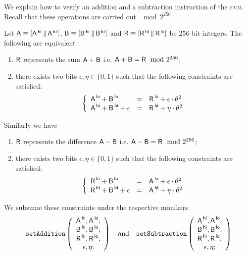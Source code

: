 We explain how to verify an addition and a subtraction instruction of the \textsc{evm}. Recall that these operations are carried out $\mod 2^{256}$.
\begin{lem}
Let
$\mathsf{A} \equiv [\mathsf{A}^{\mathsf{\,hi}} \,\|\, \mathsf{A}^{\mathsf{\,lo}}]$,
$\mathsf{B} \equiv [\mathsf{B}^{\mathsf{\,hi}} \,\|\, \mathsf{B}^{\mathsf{\,lo}}]$ and
$\mathsf{R} \equiv [\mathsf{R}^{\mathsf{\,hi}} \,\|\, \mathsf{R}^{\mathsf{\,lo}}]$
be $256$-bit integers. The following are equivalent
\begin{enumerate}
	\item $\mathsf{R}$ represents the sum $\textsf{A} + \textsf{B}$ i.e. $\textsf{A} + \textsf{B} = \textsf{R} \mod 2^{256}$;
	\item there exists two bits $\epsilon,\eta\in\{0,1\}$ such that the following constraints are satisfied:
	\[
		\left\{ \begin{array}{lcl}
			\textsf{A}^{\mathsf{\,lo}}  + \textsf{B}^{\mathsf{\,lo}}             & = & \textsf{R}^{\mathsf{\,lo}}  + \epsilon \cdot \theta^2 \\
			\textsf{A}^{\mathsf{\,hi}} + \textsf{B}^{\mathsf{\,hi}} + \epsilon & = & \textsf{R}^{\mathsf{\,hi}} + \eta     \cdot \theta^2 \\
		\end{array} \right.
	\]
\end{enumerate}
Similarly we have
\begin{enumerate}
	\item $\mathsf{R}$ represents the difference $\textsf{A} - \textsf{B}$ i.e. $\textsf{A} - \textsf{B} = \textsf{R} \mod 2^{256}$;%
	\item there exists two bits $\epsilon,\eta\in\{0,1\}$ such that the following constraints are satisfied:
	\[
		\left\{ \begin{array}{lcl}
			\textsf{R}^{\mathsf{\,lo}} + \textsf{B}^{\mathsf{\,lo}}              & = & \textsf{A}^{\mathsf{\,lo}}  + \epsilon \cdot \theta^2 \\
			\textsf{R}^{\mathsf{\,hi}} + \textsf{B}^{\mathsf{\,hi}} + \epsilon & = & \textsf{A}^{\mathsf{\,hi}} + \eta     \cdot \theta^2    \\
		\end{array} \right.
	\]
\end{enumerate}
\end{lem}
We subsume these constraints under the respective monikers
\[
	\texttt{setAddition}\left(
	\begin{array}{c}
		\textsf{A}^{\mathsf{\,hi}}, \textsf{A}^{\mathsf{\,lo}}; \\
		\textsf{B}^{\mathsf{\,hi}}, \textsf{B}^{\mathsf{\,lo}}; \\
		\textsf{R}^{\mathsf{\,hi}}, \textsf{R}^{\mathsf{\,lo}}; \\
		\epsilon, \eta;            \\
	\end{array}
	\right)
	\quad\text{and}\quad
	\texttt{setSubtraction}\left(
	\begin{array}{c}
		\textsf{A}^{\mathsf{\,hi}}, \textsf{A}^{\mathsf{\,lo}}; \\
		\textsf{B}^{\mathsf{\,hi}}, \textsf{B}^{\mathsf{\,lo}}; \\
		\textsf{R}^{\mathsf{\,hi}}, \textsf{R}^{\mathsf{\,lo}}; \\
		\epsilon, \eta;            \\
	\end{array}
	\right)
\]
